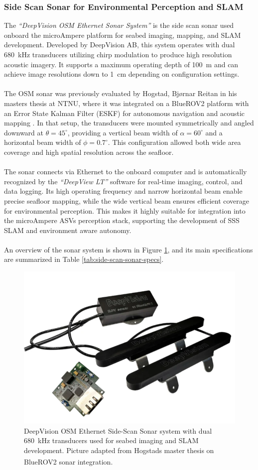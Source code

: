 \subsubsection{Side Scan Sonar for Environmental Perception and SLAM}
The \textit{``DeepVision OSM Ethernet Sonar System''} is the side scan sonar used onboard the microAmpere platform for seabed imaging, mapping, and SLAM development. Developed by DeepVision AB, this system operates with dual 680~kHz transducers utilizing chirp modulation to produce high resolution acoustic imagery. It supports a maximum operating depth of 100~m and can achieve image resolutions down to 1~cm depending on configuration settings.
\\ \\
The OSM sonar was previously evaluated by Hogstad, Bjørnar Reitan in his masters thesis at NTNU, where it was integrated on a BlueROV2 platform with an Error State Kalman Filter (ESKF) for autonomous navigation and acoustic mapping \cite{side_scan_sonar_master_thesis_old}. In that setup, the transducers were mounted symmetrically and angled downward at $\theta = 45^{\circ}$, providing a vertical beam width of $\alpha = 60^{\circ}$ and a horizontal beam width of $\phi = 0.7^{\circ}$. This configuration allowed both wide area coverage and high spatial resolution across the seafloor.
\\ \\
The sonar connects via Ethernet to the onboard computer and is automatically recognized by the \textit{``DeepView LT''} software for real-time imaging, control, and data logging. Its high operating frequency and narrow horizontal beam enable precise seafloor mapping, while the wide vertical beam ensures efficient coverage for environmental perception. This makes it highly suitable for integration into the microAmpere ASVs perception stack, supporting the development of SSS SLAM and environment aware autonomy.
\\ \\
An overview of the sonar system is shown in Figure \ref{fig:microAmpere-side-scan-sonar}, and its main specifications are summarized in Table \ref{tab:side-scan-sonar-specs}.
\begin{figure}[H]
    \centering
    \includegraphics[width=0.5\linewidth]{Pictures/Hardware/Sensors/Side_Scan_Sonar.png}
    \caption{DeepVision OSM Ethernet Side-Scan Sonar system with dual 680~kHz transducers used for seabed imaging and SLAM development. Picture adapted from Hogstads master thesis on BlueROV2 sonar integration.\textsuperscript{\cite{side_scan_sonar_master_thesis_old}}}
    \label{fig:microAmpere-side-scan-sonar}
\end{figure}


